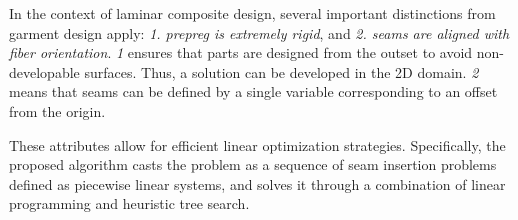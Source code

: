 In the context of laminar composite design, several important distinctions from garment design apply: \emph{1. prepreg is extremely rigid}, and \emph{2. seams are aligned with fiber orientation}. \emph{1} ensures that parts are designed from the outset to avoid non-developable surfaces. Thus, a solution can be developed in the 2D domain. \emph{2} means that seams can be defined by a single variable corresponding to an offset from the origin.

These attributes allow for efficient linear optimization strategies. Specifically, the proposed algorithm casts the problem as a sequence of seam insertion problems defined as piecewise linear systems, and solves it through a combination of linear programming and heuristic tree search.